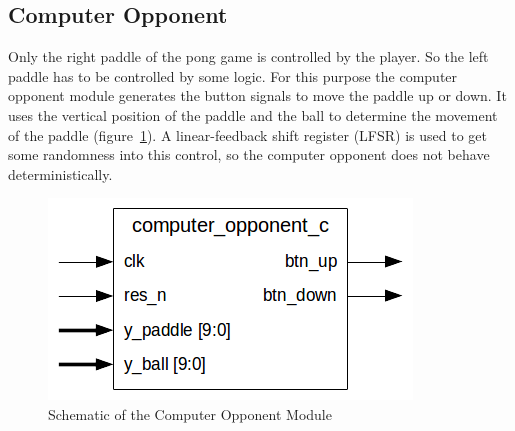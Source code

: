     \subsection{Computer Opponent}
        Only the right paddle of the pong game is controlled by the player. So the left paddle has to be controlled by some logic. For this purpose the computer opponent module generates the button signals to move the paddle up or down. It uses the vertical position of the paddle and the ball to determine the movement of the paddle (figure~\ref{comp_sch}). A linear-feedback shift register (LFSR) is used to get some randomness into this control, so the computer opponent does not behave deterministically.
	    \begin{figure}[h]
		    \centering
		    \includegraphics[scale=0.7]{images/computer_opponent_schematic.png}
		    \caption{Schematic of the Computer Opponent Module}
		    \label{comp_sch}
	    \end{figure}
